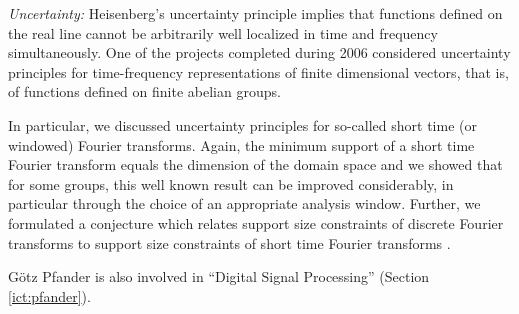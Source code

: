 

%
%



\smallskip

{\sl Uncertainty:} Heisenberg's uncertainty principle implies
that functions defined on the real line cannot be arbitrarily well
localized in time and frequency simultaneously. One of the projects
completed during 2006 considered uncertainty principles for
time-frequency representations of finite dimensional vectors, that
is, of functions defined on finite abelian groups.


In particular, we discussed  uncertainty principles for
so-called short time (or windowed) Fourier transforms. Again, the
minimum support of a short time Fourier transform equals the
dimension of the domain space and we showed that for some groups,
this well known result can be improved considerably, in particular
through the choice of an appropriate analysis window. Further, we
formulated a conjecture which relates support size constraints of
discrete Fourier transforms to support size constraints of short
time Fourier transforms \cite{KPR06}.

\medskip

  G\"otz Pfander is also involved in  ``Digital Signal Processing''
  (Section \ref{ict:pfander}).







